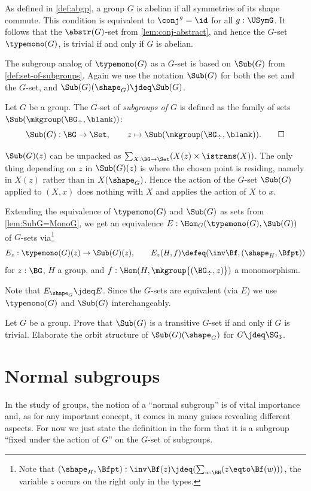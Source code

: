 \begin{remark}\label{rem:typeofsubgpstrivifab}
As defined in \cref{def:abgp}, a group $G$ is abelian if 
all symmetries of its shape commute. This condition
is equivalent to $\conj^g = \id$ for all $g:\USymG$.
It follows that the $\abstr(G)$-set from \cref{lem:conj-abstract},
and hence the $G$-set $\typemono(G)$, is trivial if and only if
$G$ is abelian.
\end{remark}

The subgroup analog of $\typemono(G)$ as a $G$-set is based
on $\Sub(G)$ from \cref{def:set-of-subgroups}. Again we use 
the notation $\Sub(G)$ for both the set and the $G$-set,
and $\Sub(G)(\sh_G)\jdeq\Sub(G)$.

\begin{definition}
  Let $G$ be a group. The $G$-set of \emph{subgroups of $G$} is defined
  as the family of sets $\Sub(\mkgroup(\BG_\div,\blank))$:
\[
\Sub(G):\BG\to\Set,\qquad z\mapsto \Sub(\mkgroup(\BG_\div,\blank)).\qedhere
\]
\end{definition}
$\Sub(G)(z)$ can be unpacked as $\sum_{X:\BG\to\Set}(X(z)\times\istrans(X))$.
The only thing depending on $z$ in $\Sub(G)(z)$ is where the 
chosen point is residing, namely in $X(z)$ rather than in $X(\sh_G)$.
Hence the action of the $G$-set $\Sub(G)$ applied to $(X,x)$ does
nothing with $X$ and applies the action of $X$ to $x$.

\begin{definition}
  Extending the equivalence of $\typemono(G)$ and $\Sub(G)$ as sets 
from \cref{lem:SubG=MonoG}, we get an equivalence
$E:\Hom_G(\typemono(G),\Sub(G))$ of $G$-sets via\footnote{%
Note that $(\sh_H,\Bfpt) : \inv\Bf(z)\jdeq(\sum_{w:\BH}(z\eqto\Bf(w)))$,
the variable $z$ occurs on the right only in the types.}
\[
E_z:\typemono(G)(z)\to\Sub(G)(z),\qquad 
E_z(H,f)\defeq(\inv\Bf,(\sh_H,\Bfpt) )
\]
for $z:\BG$, $H$ a group, 
and $f:\Hom(H,\mkgroup{(\BG_\div,z)})$ a monomorphism.
\end{definition}
Note that $E_{\sh_G} \jdeq E$.
Since the $G$-sets are equivalent (via $E$) we use $\typemono(G)$ and $\Sub(G)$ interchangeably.

\begin{xca}\label{xca:Sub(Sigma3)}
Let $G$ be a group.
Prove that $\Sub(G)$ is a transitive $G$-set if and only if $G$ is trivial.
Elaborate the orbit structure of $\Sub(G)(\sh_G)$ for $G\jdeq\SG_3$.
\end{xca}

\section{Normal subgroups}
\label{sec:normal}
In the study of groups, the notion of a ``normal subgroup'' is of vital importance
and, as for any important concept, it comes in many guises revealing different aspects.
For now we just state the definition in the form that it is a subgroup ``fixed under the action of $G$'' on the $G$-set of subgroups.

